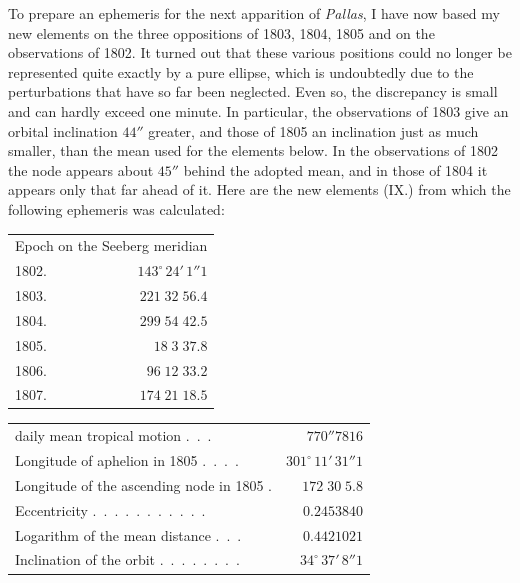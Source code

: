 \par\indent To prepare an ephemeris for the next apparition of \emph{Pallas}, I have now based my new elements on the three oppositions of 1803, 1804, 1805 and on the observations of 1802. It turned out that these various positions could no longer be represented quite exactly by a pure ellipse, which is undoubtedly due to the perturbations that have so far been neglected. Even so, the discrepancy is small and can hardly exceed one minute. In particular, the observations of 1803 give an orbital inclination $44''$ greater, and those of 1805 an inclination just as much smaller, than the mean used for the elements below. In the observations of 1802 the node appears about $45''$ behind the adopted mean, and in those of 1804 it appears only that far ahead of it. Here are the new elements (IX.) from which the following ephemeris was calculated:
\begin{center}\begingroup
\fontsize{9}{11}\selectfont
\setlength{\tabcolsep}{2pt}\renewcommand{\arraystretch}{1.12}
\begin{tabular}{lr}
\multicolumn{2}{c}{Epoch on the Seeberg meridian} \\
1802. & $143^\circ\,24'\,1''1$ \\
1803. & $221\;32\;56.4$ \\
1804. & $299\;54\;42.5$ \\
1805. & $18\;3\;37.8$ \\
1806. & $96\;12\;33.2$ \\
1807. & $174\;21\;18.5$ \\
\end{tabular}\endgroup\end{center}
\begin{center}\begingroup
\fontsize{9}{11}\selectfont
\setlength{\tabcolsep}{2pt}\renewcommand{\arraystretch}{1.12}
\begin{tabular}{lr}
daily mean tropical motion .\ .\ . & $770''7816$ \\
Longitude of aphelion in 1805 .\ .\ .\ . & $301^\circ\,11'\,31''1$ \\
Longitude of the ascending node in 1805 . & $172\;30\;5.8$ \\
Eccentricity .\ .\ .\ .\ .\ .\ .\ .\ .\ .\ . & $0.2453840$ \\
Logarithm of the mean distance .\ .\ . & $0.4421021$ \\
Inclination of the orbit .\ .\ .\ .\ .\ .\ .\ . & $34^\circ\,37'\,8''1$ \\
\end{tabular}\endgroup\end{center}

